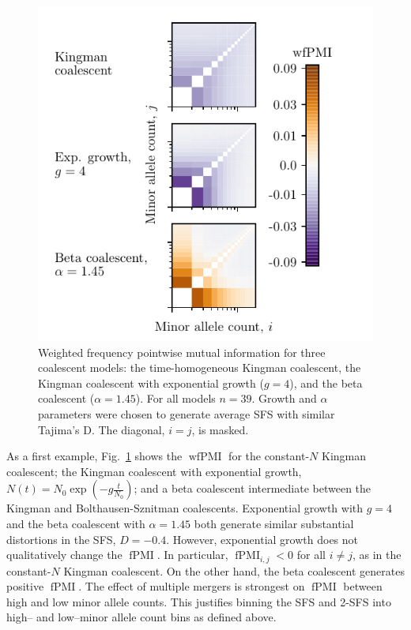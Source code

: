 \documentclass[11pt, letterpaper]{article}   	%
\newcommand{\fig}[1]{Fig.~\ref{#1}}
\DeclareMathOperator{\fpmi}{fPMI}
\DeclareMathOperator{\wfpmi}{wfPMI}
\begin{document}
\begin{figure}
\centering
\includegraphics[scale=1]{figures/wfpmi_no_recombination.pdf}
\caption{Weighted frequency pointwise mutual information for three coalescent models: the time-homogeneous Kingman coalescent, the Kingman coalescent with exponential growth ($g=4$), and the beta coalescent ($\alpha=1.45$). For all models $n=39$. Growth and $\alpha$ parameters were chosen to generate average SFS with similar Tajima's D. The diagonal, $i=j$, is masked. \label{fig:nonrecombining_pmi}}
\end{figure}

As a first example, \fig{fig:nonrecombining_pmi} shows the $\wfpmi$ for the constant-$N$ Kingman coalescent; the Kingman coalescent with exponential growth, $N(t)=N_0 \exp(-g \frac{t}{N_0})$; and a beta coalescent intermediate between the Kingman and Bolthausen-Sznitman coalescents.
Exponential growth with $g=4$ and the beta coalescent with $\alpha=1.45$ both generate similar substantial distortions in the SFS, $D = -0.4$.
However, exponential growth does not qualitatively change the $\fpmi$.
In particular, $\fpmi_{i,j} < 0$ for all $i \neq j$, as in the constant-$N$ Kingman coalescent.
On the other hand, the beta coalescent generates positive $\fpmi$.
The effect of multiple mergers is strongest on $\fpmi$ between high and low minor allele counts.
This justifies binning the SFS and 2-SFS into high-- and low--minor allele count bins as defined above.
\end{document}
